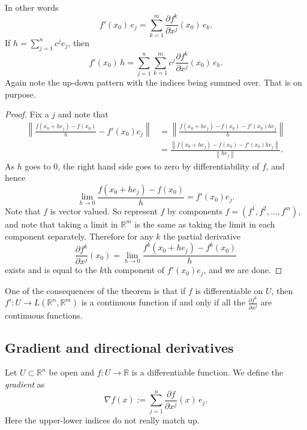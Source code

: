 \documentclass[12pt]{book}
\newcommand{\norm}[1]{\left\lVert {#1} \right\rVert}
\newcommand{\R}{{\mathbb{R}}}
\newcommand{\myindex}[1]{#1\index{#1}}
\theoremstyle{plain}
\theoremstyle{remark}
\theoremstyle{definition}
\theoremstyle{exercise}
\theoremstyle{example}
\begin{document}
In other words
\begin{equation*}
f'(x_0) \, e_j =
\sum_{k=1}^m
\frac{\partial f^k}{\partial x^j}(x_0) \,e_k .
\end{equation*}
If $h = \sum_{j=1}^n c^j e_j$, then
\begin{equation*}
f'(x_0) \, h =
\sum_{j=1}^n
\sum_{k=1}^m
 c^j
\frac{\partial f^k}{\partial x^j}(x_0) \,e_k .
\end{equation*}
Again note the up-down pattern with the indices being summed over.
That is on purpose.

\begin{proof}
Fix a $j$ and note that
\begin{equation*}
\begin{split}
\norm{\frac{f(x_0+h e_j)-f(x_0)}{h} - f'(x_0) e_j} & = 
\norm{\frac{f(x_0+h e_j)-f(x_0) - f'(x_0) h e_j}{h}} \\
& =
\frac{\norm{f(x_0+h e_j)-f(x_0) - f'(x_0) h e_j}}{\norm{h e_j}} .
\end{split}
\end{equation*}
As $h$ goes to 0, the right hand side goes to zero by
differentiability of $f$, and hence
\begin{equation*}
\lim_{h \to 0}
\frac{f(x_0+h e_j)-f(x_0)}{h} = f'(x_0) e_j  .
\end{equation*}
Note that $f$ is vector valued.  So represent $f$ by components
$f = (f^1,f^2,\ldots,f^m)$, and note that taking a limit in $\R^m$
is the same as taking the limit in each component separately.  Therefore
for any $k$
the partial derivative
\begin{equation*}
\frac{\partial f^k}{\partial x^j} (x_0)
=
\lim_{h \to 0}
\frac{f^k(x_0+h e_j)-f^k(x_0)}{h}
\end{equation*}
exists and 
is equal to the $k$th component of $f'(x_0) e_j$, and we are done.
\end{proof}

One of the consequences of the theorem is that if $f$
is differentiable on $U$, then $f' \colon U \to
L(\R^n,\R^m)$ is a continuous function if and only if
all the $\frac{\partial f^k}{\partial x^j}$ are continuous functions.

\subsection{Gradient and directional derivatives}

Let $U \subset \R^n$ be open and $f \colon U \to \R$ is a differentiable
function.  We define
the \emph{\myindex{gradient}} as
\begin{equation*}
\nabla f (x) := \sum_{j=1}^n \frac{\partial f}{\partial x^j} (x)\, e_j .
\end{equation*}
Here
the upper-lower indices do not really match up.
\end{document}
